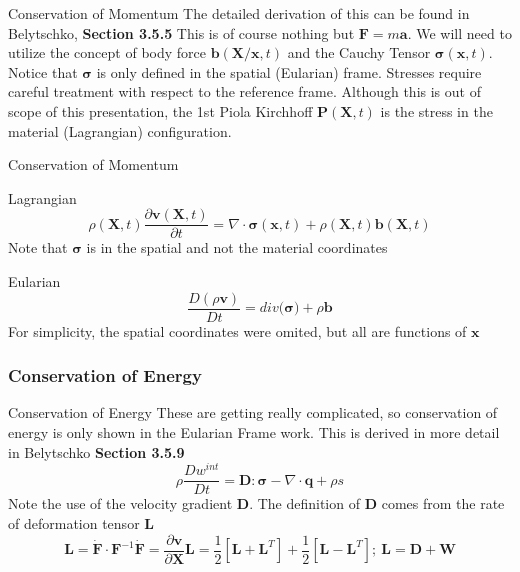 \documentclass{beamer}
\begin{document}
\begin{frame}{Conservation of Momentum}
The detailed derivation of this can be found in Belytschko, \textbf{Section 3.5.5}
This is of course nothing but $\bm{F}=m\bm{a}$.
\vspace{0.25cm}
We will need to utilize the concept of body force $\bm{b}(\bm{X/x},t)$
and the Cauchy Tensor $\bm{\sigma}(\bm{x},t)$. Notice that $\bm{\sigma}$ is only defined in the spatial (Eularian) frame.
Stresses require careful treatment with respect to the reference frame. Although this is out of scope of this presentation, 
the 1st Piola Kirchhoff $\bm{P}(\bm{X},t)$ is the stress in the material (Lagrangian) configuration.
\end{frame}

\begin{frame}{Conservation of Momentum}
\begin{block}{Lagrangian}
	\begin{equation}
		\rho(\bm{X},t)\frac{\partial\bm{v}(\bm{X},t)}{\partial t}=\nabla\cdot\bm{\sigma}(\bm{x},t)+\rho(\bm{X},t)\bm{b}(\bm{X},t)
	\end{equation}
    Note that $\bm{\sigma}$ is in the spatial and not the material coordinates
\end{block}

\begin{block}{Eularian}
	\begin{equation}
		\frac{D(\rho\bm{v})}{Dt}=div(\bm{\sigma)}+\rho\bm{b}
	\end{equation}
	For simplicity, the spatial coordinates were omited, but all are functions of $\bm{x}$
\end{block}
\end{frame}

\subsubsection{Conservation of Energy}

\begin{frame}{Conservation of Energy}
These are getting really complicated, so conservation of energy is only shown in the Eularian Frame work.
This is derived in more detail in Belytschko \textbf{Section 3.5.9}
	\begin{equation}
		\rho\frac{Dw^{int}}{Dt}=\bm{D}:\bm{\sigma}-\nabla\cdot\bm{q}+\rho s
	\end{equation}
	Note the use of the velocity gradient $\bm{D}$. The definition of $\bm{D}$ comes from the rate of deformation tensor $\bm{L}$
	\begin{subequations}
		\begin{equation}
			\bm{L}=\dot{\bm{F}}\cdot\bm{F}^{-1}
		\end{equation}
		\begin{equation}
			\dot{\bm{F}}=\frac{\partial \bm{v}}{\partial \bm{X}}
		\end{equation}
		\begin{equation}
			\bm{L}=\frac{1}{2}[\bm{L}+\bm{L}^{T}]+\frac{1}{2}[\bm{L}-\bm{L}^{T}];\
			\bm{L}=\bm{D}+\bm{W}
		\end{equation}
	\end{subequations}
\end{frame}
\end{document}
